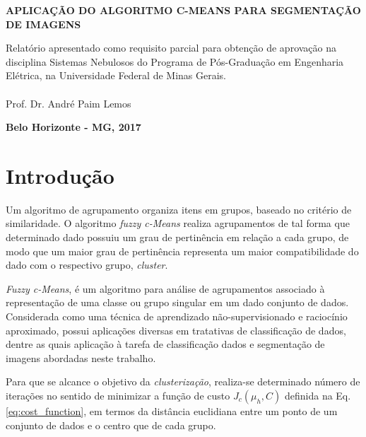 \documentclass[12pt,a4paper]{article}
\numberwithin{equation}{section}
\begin{document}
\vspace{35 mm}
\begin{center}
\textbf{APLICAÇÃO DO ALGORITMO C-MEANS PARA SEGMENTAÇÃO DE IMAGENS}\\
\end{center}

\vspace{30 mm}

\vspace{35mm}
\hspace{8cm}\begin{minipage}[r]{0.45\linewidth}
Relatório apresentado como requisito parcial para obtenção de aprovação na disciplina Sistemas Nebulosos do Programa de Pós-Graduação em Engenharia Elétrica, na Universidade Federal de Minas Gerais.\\ 
\\
Prof. Dr. André Paim Lemos
\end{minipage}

\vspace{50mm}
\begin{center}
\textbf{Belo Horizonte - MG, 2017}
\end{center}

\thispagestyle{empty}
\newpage
\tableofcontents
\newpage
\listoffigures
\newpage
{}

\section{Introdução}
Um algoritmo de agrupamento organiza itens em grupos, baseado no critério de similaridade. O algoritmo \textit{fuzzy c-Means} realiza agrupamentos de tal forma que determinado dado possuiu um grau de pertinência em relação a cada grupo, de modo que um maior grau de pertinência representa um maior compatibilidade do dado com o respectivo grupo, \textit{cluster}. 

\textit{Fuzzy c-Means}, é um algoritmo para análise de agrupamentos associado à representação de uma classe ou grupo singular em um dado conjunto de dados. Considerada como uma técnica de aprendizado não-supervisionado e raciocínio aproximado, possui aplicações diversas em tratativas de classificação de dados, dentre as quais aplicação à tarefa de classificação dados e segmentação de imagens abordadas neste trabalho.


Para que se alcance o objetivo da \textit{clusterização}, realiza-se determinado número de iterações no sentido de minimizar a função de custo $J_{c}(\mu_{h},C)$ definida na Eq. \eqref{eq:cost_function}, em termos da distância euclidiana entre um ponto de um conjunto de dados e o centro que de cada grupo.
\end{document}
